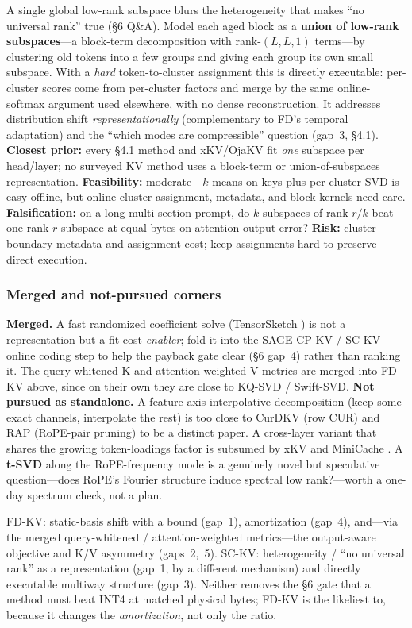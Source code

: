 \documentclass[10pt]{article}
\newcommand{\term}[1]{\textbf{\color{accent!85!black}#1}}
\begin{document}
A single global low-rank subspace blurs the heterogeneity that makes ``no universal rank'' true
(\S6 Q\&A). Model each aged block as a \term{union of low-rank subspaces}---a block-term
decomposition \cite{btd} with rank-$(L,L,1)$ terms---by clustering old tokens into a few groups
and giving each group its own small subspace. With a \emph{hard} token-to-cluster assignment this
is directly executable: per-cluster scores come from per-cluster factors and merge by the same
online-softmax argument used elsewhere, with no dense reconstruction. It addresses distribution
shift \emph{representationally} (complementary to FD's temporal adaptation) and the ``which modes
are compressible'' question (gap~3, \S4.1). \term{Closest prior:} every \S4.1 method and
xKV/OjaKV fit \emph{one} subspace per head/layer; no surveyed KV method uses a block-term or
union-of-subspaces representation. \term{Feasibility:} moderate---$k$-means on keys plus
per-cluster SVD is easy offline, but online cluster assignment, metadata, and block kernels need
care. \term{Falsification:} on a long multi-section prompt, do $k$ subspaces of rank $r/k$ beat one
rank-$r$ subspace at equal bytes on attention-output error? \term{Risk:} cluster-boundary metadata
and assignment cost; keep assignments hard to preserve direct execution.

\subsubsection*{Merged and not-pursued corners}

\textbf{Merged.} A fast randomized coefficient solve (TensorSketch \cite{tensorsketch}) is not a
representation but a fit-cost \emph{enabler}; fold it into the SAGE-CP-KV / SC-KV online coding
step to help the payback gate clear (\S6 gap~4) rather than ranking it. The query-whitened K and
attention-weighted V metrics are merged into FD-KV above, since on their own they are close to
KQ-SVD / Swift-SVD. \textbf{Not pursued as standalone.} A feature-axis interpolative decomposition
(keep some exact channels, interpolate the rest) is too close to CurDKV (row CUR) and RAP
(RoPE-pair pruning) to be a distinct paper. A cross-layer variant that shares the growing
token-loadings factor is subsumed by xKV \cite{xkv} and MiniCache \cite{minicache}. A \term{t-SVD}
along the RoPE-frequency mode \cite{tsvd} is a genuinely novel but speculative question---does
RoPE's Fourier structure induce spectral low rank?---worth a one-day spectrum check, not a plan.

\begin{gapbox}[title={Which \S6 gaps the two surviving ideas close}]
FD-KV: static-basis shift with a bound (gap~1), amortization (gap~4), and---via the merged
query-whitened / attention-weighted metrics---the output-aware objective and K/V asymmetry
(gaps~2,~5). SC-KV: heterogeneity / ``no universal rank'' as a representation (gap~1, by a
different mechanism) and directly executable multiway structure (gap~3). Neither removes the \S6
gate that a method must beat INT4 at matched physical bytes; FD-KV is the likeliest to, because it
changes the \emph{amortization}, not only the ratio.
\end{gapbox}
\end{document}
